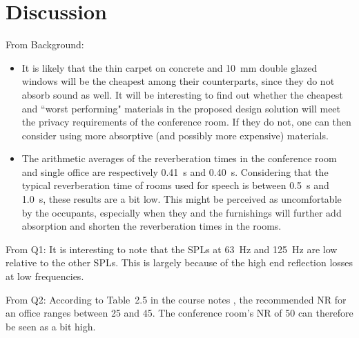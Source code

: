 \section{Discussion}

From Background:
\begin{itemize}
	\item It is likely that the thin carpet on concrete and 10~mm double glazed windows will be the cheapest among their counterparts, since they do not absorb sound as well.
	It will be interesting to find out whether the cheapest and ``worst performing" materials in the proposed design solution will meet the privacy requirements of the conference room.
	If they do not, one can then consider using more absorptive (and possibly more expensive) materials.
	\item The arithmetic averages of the reverberation times in the conference room and single office are respectively 0.41~s and 0.40~s.
	Considering that the typical reverberation time of rooms used for speech is between 0.5~s and 1.0~s, these results are a bit low.
	This might be perceived as uncomfortable by the occupants, especially when they and the furnishings will further add absorption and shorten the reverberation times in the rooms.
\end{itemize}

From Q1:
It is interesting to note that the SPLs at 63~Hz and 125~Hz are low relative to the other SPLs.
This is largely because of the high end reflection losses at low frequencies.

From Q2:
According to Table~2.5 in the course notes \citep{unit2}, the recommended NR for an office ranges between 25 and 45.
The conference room's NR of 50 can therefore be seen as a bit high.

